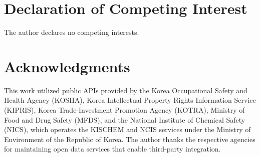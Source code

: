 \documentclass[preprint,12pt]{elsarticle}
\begin{document}

\section*{Declaration of Competing Interest}

The author declares no competing interests.


\section*{Acknowledgments}

This work utilized public APIs provided by the Korea Occupational Safety and Health Agency (KOSHA), Korea Intellectual Property Rights Information Service (KIPRIS), Korea Trade-Investment Promotion Agency (KOTRA), Ministry of Food and Drug Safety (MFDS), and the National Institute of Chemical Safety (NICS), which operates the KISCHEM and NCIS services under the Ministry of Environment of the Republic of Korea. The author thanks the respective agencies for maintaining open data services that enable third-party integration.

\end{document}
